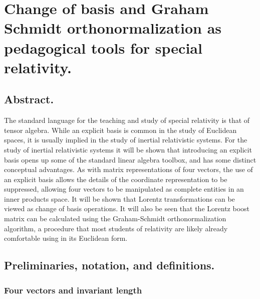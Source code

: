
%

\chapter{Change of basis and Graham Schmidt orthonormalization as pedagogical tools for special relativity.}
\label{chap:grahamSchmidtLorentz}
{}
\date{April 14, 2011}

\beginArtWithToc

\section{Abstract.}

The standard language for the teaching and study of special relativity is that of tensor algebra.  
While an explicit basis is common in the study of Euclidean spaces, it is usually implied in the study of inertial relativistic systems.  
For the study of inertial relativistic systems it will be shown that introducing an explicit basis opens up some of the standard linear algebra toolbox, and has some distinct conceptual advantages.
As with matrix representations of four vectors, the use of an explicit basis allows the details of the coordinate representation to be suppressed, allowing four vectors to be manipulated as complete entities in an inner products space.
It will be shown that Lorentz transformations can be viewed as change of basis operations.  It will also be seen that the Lorentz boost matrix can be calculated using the Graham-Schmidt orthonormalization algorithm, a procedure that most students of relativity are likely already comfortable using in its Euclidean form.

\section{Preliminaries, notation, and definitions.}

\subsection{Four vectors and invariant length}

